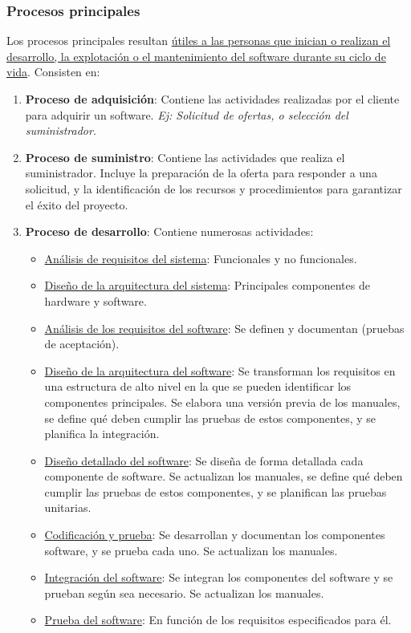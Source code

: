\subsubsection{Procesos principales}
Los procesos principales resultan \uline{útiles a las personas que inician o realizan el desarrollo, la explotación o el mantenimiento del software durante su ciclo de vida}. Consisten en:
\begin{enumerate}
    \item \textbf{Proceso de adquisición}: Contiene las actividades realizadas por el cliente para adquirir un software. \textit{Ej: Solicitud de ofertas, o selección del suministrador}.
    \item \textbf{Proceso de suministro}: Contiene las actividades que realiza el suministrador. Incluye la preparación de la oferta para responder a una solicitud, y la identificación de los recursos y procedimientos para garantizar el éxito del proyecto.
    \item\textbf{Proceso de desarrollo}: Contiene numerosas actividades:
    \begin{itemize}
        \item \uline{Análisis de requisitos del sistema}: Funcionales y no funcionales.
        \item \uline{Diseño de la arquitectura del sistema}: Principales componentes de hardware y software.
        \item \uline{Análisis de los requisitos del software}: Se definen y documentan (pruebas de aceptación).
        \item \uline{Diseño de la arquitectura del software}: Se transforman los requisitos en una estructura de alto nivel en la que se pueden identificar los componentes principales. Se elabora una versión previa de los manuales, se define qué deben cumplir las pruebas de estos componentes, y se planifica la integración.
        \item \uline{Diseño detallado del software}: Se diseña de forma detallada cada componente de software. Se actualizan los manuales, se define qué deben cumplir las pruebas de estos componentes, y se planifican las pruebas unitarias.
        \item \uline{Codificación y prueba}: Se desarrollan y documentan los componentes software, y se prueba cada uno. Se actualizan los manuales.
        \item \uline{Integración del software}: Se integran los componentes del software y se prueban según sea necesario. Se actualizan los manuales.
        \item \uline{Prueba del software}: En función de los requisitos especificados para él.

\end{itemize}
\end{enumerate}
